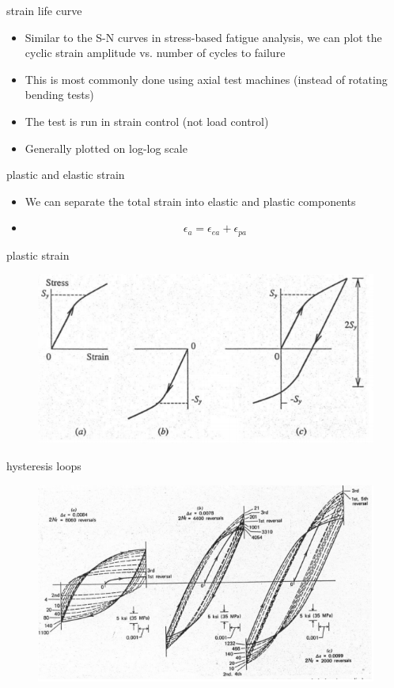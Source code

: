 \documentclass[10pt]{beamer}
\begin{document}
\begin{frame}{strain life curve}
	\begin{itemize}[<+->]
		\item Similar to the S-N curves in stress-based fatigue analysis, we can plot the cyclic strain amplitude vs. number of cycles to failure
		\item This is most commonly done using axial test machines (instead of rotating bending tests)
		\item The test is run in strain control (not load control)
		\item Generally plotted on log-log scale
	\end{itemize}
\end{frame}

\begin{frame}{plastic and elastic strain}
	\begin{itemize}[<+->]
		\item We can separate the total strain into elastic and plastic components
		\item[] \begin{equation}
		\epsilon_a = \epsilon_{ea} + \epsilon_{pa}
		\end{equation}
	\end{itemize}
\end{frame}

\begin{frame}{plastic strain}
	\begin{figure}
	\centering
	\includegraphics[width=0.7\linewidth]{"../Figures/plastic_strain"}
	\label{fig:plasticstrain}
	\end{figure}
\end{frame}

\begin{frame}{hysteresis loops}
	\begin{figure}
	\centering
	\includegraphics[width=0.7\linewidth]{"../Figures/hysteresis_loops"}
	\label{fig:hysteresisloops}
\end{figure}
\end{frame}
\end{document}
